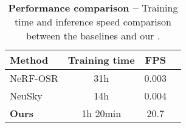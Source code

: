 
\begin{table}[t]
  \centering
  \caption{\textbf{Performance comparison --}
    Training time and inference speed comparison between the baselines and our
    \lumigauss.
  }
  \vspace{-0.2em}
  \begin{tabular}{lccc}
    \toprule
    \textbf{Method}                   & \textbf{Training time} & \textbf{FPS} \\
    \midrule
    NeRF-OSR \cite{rudnev2022nerfosr} & 31h                    & 0.003        \\
    NeuSky \cite{gardner2023neusky}   & 14h                    & 0.004        \\
    \textbf{Ours}                     & 1h 20min               & 20.7         \\
    \bottomrule
  \end{tabular}
  \label{tab:lumigauss-performance}
\end{table}
